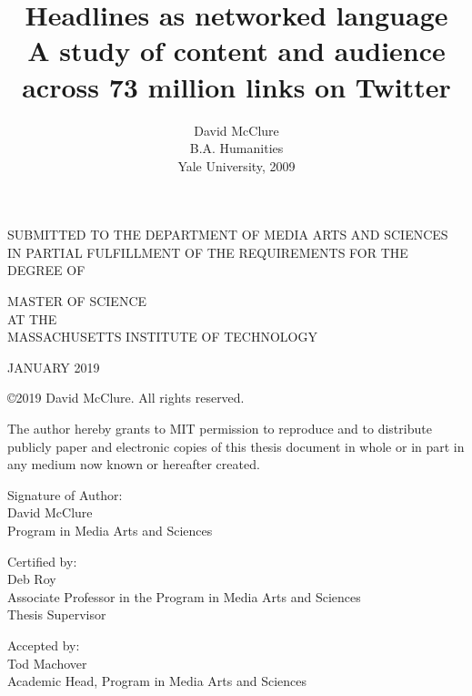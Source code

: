 \documentclass{scrartcl}
\begin{document}
\title{%
  \vspace{-2cm}Headlines as networked language\vspace{1ex} \\
  \large A study of content and audience across 73 million links on Twitter
}

\author{
  David McClure\vspace{3ex}\\
  B.A. Humanities\\
  Yale University, 2009
}

\date{\vspace{-5ex}}

\maketitle

\begin{center}
SUBMITTED TO THE DEPARTMENT OF MEDIA ARTS AND SCIENCES IN PARTIAL FULFILLMENT OF THE REQUIREMENTS FOR THE DEGREE OF

MASTER OF SCIENCE\\
AT THE\\
MASSACHUSETTS INSTITUTE OF TECHNOLOGY

JANUARY 2019

©2019 David McClure. All rights reserved.

The author hereby grants to MIT permission to reproduce and to distribute publicly paper and electronic copies of this thesis document in whole or in part in any medium now known or hereafter created.
\end{center}

Signature of Author: \makebox[\linegoal]{\hrulefill}\\
David McClure\\
Program in Media Arts and Sciences\vspace{3ex}

Certified by: \makebox[\linegoal]{\hrulefill}\\
Deb Roy\\
Associate Professor in the Program in Media Arts and Sciences\\
Thesis Supervisor\vspace{3ex}

Accepted by: \makebox[\linegoal]{\hrulefill}\\
Tod Machover\\
Academic Head, Program in Media Arts and Sciences

\newpage
\end{document}
